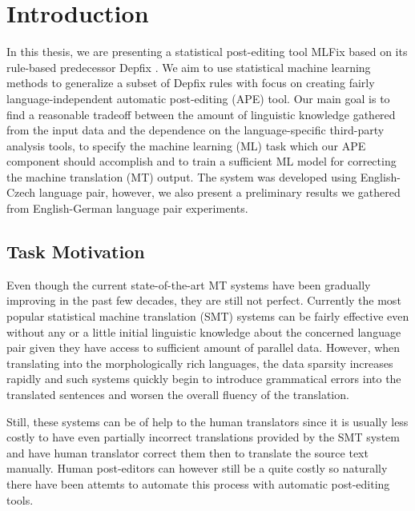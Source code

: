 \chapter{Introduction}

In this thesis, we are presenting a statistical post-editing tool MLFix
based on its rule-based predecessor Depfix \citep{depfix:2014}.
We aim to use statistical machine learning methods to generalize a subset of Depfix rules
with focus on creating fairly language-independent automatic post-editing (APE) tool.
Our main goal is to find a reasonable tradeoff between the amount
of linguistic knowledge gathered from the input data and the dependence
on the language-specific third-party analysis tools, to specify the
machine learning (ML) task which our APE component should accomplish and to train
a sufficient ML model for correcting the machine translation (MT) output.
The system was developed using English-Czech language pair, however, we also present
a preliminary results we gathered from English-German language pair experiments.

\section{Task Motivation}

Even though the current state-of-the-art MT systems have been gradually improving in the
past few decades, they are still not perfect. Currently the most popular statistical machine
translation (SMT) systems can be fairly effective even without any or a little initial
linguistic knowledge about the concerned language pair given they have access to sufficient
amount of parallel data. However, when translating into the morphologically rich languages,
the data sparsity increases rapidly and such systems quickly begin to introduce grammatical
errors into the translated sentences and worsen the overall fluency of the translation.

Still, these systems can be of help to the human translators since it is usually less costly
to have even partially incorrect translations provided by the SMT system and have
human translator correct them then to translate the source text manually.
Human post-editors can however still be a quite costly so naturally there have been
attemts to automate this process with automatic post-editing tools.

